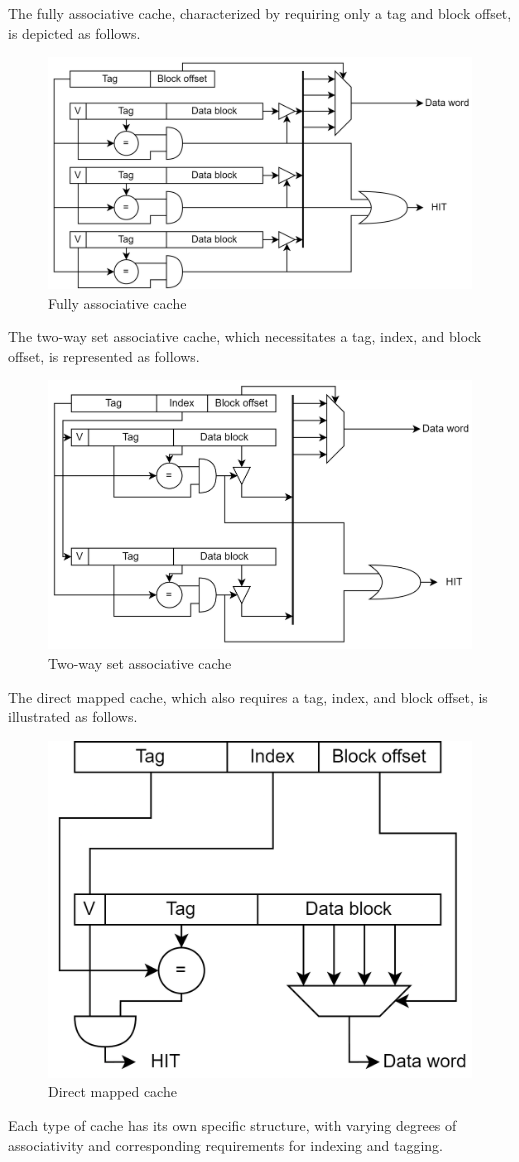 The fully associative cache, characterized by requiring only a tag and block offset, is depicted as follows.
\begin{figure}[H]
    \centering
    \includegraphics[width=0.75\linewidth]{images/fas.png} 
    \caption{Fully associative cache}
\end{figure}
The two-way set associative cache, which necessitates a tag, index, and block offset, is represented as follows.
\begin{figure}[H]
    \centering
    \includegraphics[width=0.75\linewidth]{images/twsas.png}
    \caption{Two-way set associative cache}
\end{figure}
The direct mapped cache, which also requires a tag, index, and block offset, is illustrated as follows.
\begin{figure}[H]
    \centering
    \includegraphics[width=0.5\linewidth]{images/dms.png}
    \caption{Direct mapped cache}
\end{figure}
Each type of cache has its own specific structure, with varying degrees of associativity and corresponding requirements for indexing and tagging.

